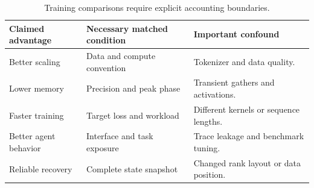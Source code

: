{\small\setlength{\tabcolsep}{3pt}
\begin{table}[!htbp]
\centering
\caption{Training comparisons require explicit accounting boundaries.}\label{tab:C07:comparison}
\begin{tabular}{L{31mm}L{34mm}L{41mm}}

\toprule Claimed advantage & Necessary matched condition & Important confound\\\midrule
Better scaling & Data and compute convention & Tokenizer and data quality.\\
Lower memory & Precision and peak phase & Transient gathers and activations.\\
Faster training & Target loss and workload & Different kernels or sequence lengths.\\
Better agent behavior & Interface and task exposure & Trace leakage and benchmark tuning.\\
Reliable recovery & Complete state snapshot & Changed rank layout or data position.\\
\bottomrule
\end{tabular}
\end{table}
}

